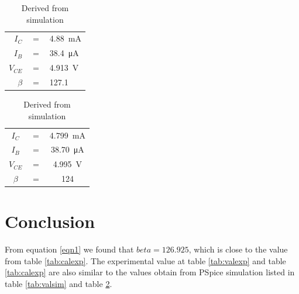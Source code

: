 \documentclass{article}
\begin{document}
\begin{table}[H]
  \parbox{.45\linewidth}{
  \centering
  \begin{tabular}{rcl}
  $I_C    $&$=$&\SI{4.88}{\milli\ampere}\\
  $I_B    $&$=$&\SI{38.4}{\micro\ampere}\\
  $V_{CE} $&$=$&\SI{4.913}{\volt}\\
  $\beta  $&$=$&127.1\\
  \end{tabular}
  \caption{Derived from circuit}
  \label{tab:calexp}
  }
  \hfill
  \parbox{.45\linewidth}{
  \centering
  \begin{tabular}{ccc}
    $I_C    $&$=$&\SI{4.799}{\milli\ampere}\\
    $I_B    $&$=$&\SI{38.70}{\micro\ampere}\\
    $V_{CE} $&$=$&\SI{4.995}{\volt}\\
    $\beta  $&$=$&124\\
  \end{tabular}
  \caption{Derived from simulation}
  \label{tab:calsim}
  }
\end{table}


\section*{Conclusion}
From equation \ref{eqn1} we found that $beta = 126.925$, which is close to the value from table \ref{tab:calexp}. The experimental value at table \ref{tab:valexp} and table \ref{tab:calexp} are also similar to the values obtain from PSpice simulation listed in table \ref{tab:valsim} and table \ref{tab:calsim}.
\end{document}
